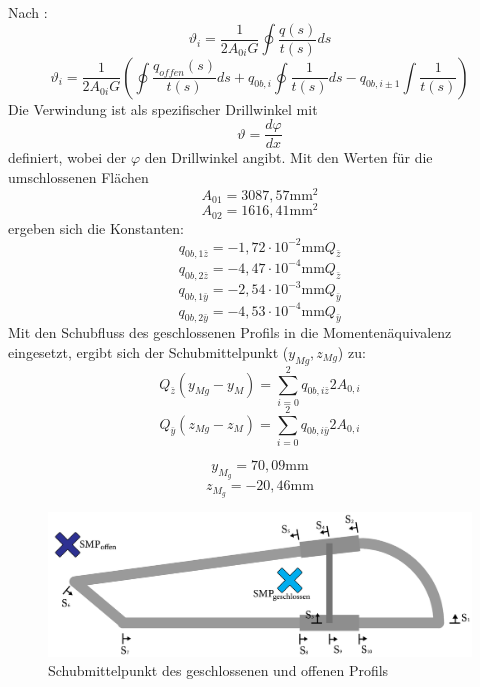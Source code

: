 Nach \cite{item15}:
\begin{equation}
	\vartheta_{i} = \frac{1}{2A_{0i}G}\oint\frac{q(s)}{t(s)}ds
\end{equation}
\begin{equation}
	\vartheta_{i} = \frac{1}{2A_{0i}G}(\oint\frac{q_{offen}(s)}{t(s)}ds+q_{0b,i}\oint\frac{1}{t(s)}ds-q_{0b,i\pm1}\int\frac{1}{t(s)})
\end{equation}
Die Verwindung ist als spezifischer Drillwinkel mit
\begin{equation}
	\vartheta = \frac{d\varphi}{dx}
\end{equation}
definiert, wobei der $\varphi$ den Drillwinkel angibt.
Mit den Werten für die umschlossenen Flächen
$$
	A_{01}=3087,57\mathrm{mm}^2
$$
$$
	A_{02}=1616,41\mathrm{mm}^2
$$
ergeben sich die Konstanten:
$$
	q_{0b,1\bar{z}}=-1,72\cdot10^{-2}\mathrm{mm}Q_{\bar{z}}
$$$$
	q_{0b,2\bar{z}}=-4,47\cdot10^{-4}\mathrm{mm}Q_{\bar{z}}
$$$$
	q_{0b,1\bar{y}}=-2,54\cdot10^{-3}\mathrm{mm}Q_{\bar{y}}
$$$$
	q_{0b,2\bar{y}}=-4,53\cdot10^{-4}\mathrm{mm}Q_{\bar{y}}
$$
Mit den Schubfluss des geschlossenen Profils in die Momentenäquivalenz eingesetzt, ergibt sich der Schubmittelpunkt ($y_{Mg}, z_{Mg}$) zu:
\begin{equation}
	Q_{\bar{z}}(y_{Mg}-y_{M})=\sum_{i=0}^{2}q_{0b,i\bar{z}}2A_{0,i}
\end{equation}
\begin{equation}
Q_{\bar{y}}(z_{Mg}-z_{M})=\sum_{i=0}^{2}q_{0b,i\bar{y}}2A_{0,i}
\end{equation}

$$
	y_{M_{g}}=70,09\mathrm{mm}
$$
$$
	z_{M_{g}}=-20,46\mathrm{mm}
$$
\begin{figure}[h]
	\centering
	\includegraphics[width=1\textwidth]{Bilder/SMP}
	\caption{Schubmittelpunkt des geschlossenen und offenen Profils}
\end{figure}
